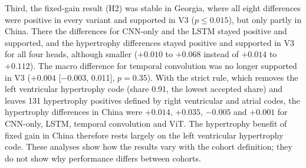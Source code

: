 \documentclass{wlscirep}
\begin{document}
Third, the fixed-gain result (H2) was stable in Georgia, where all eight differences were positive in every variant and supported in V3 ($p\le0.015$), but only partly in China. There the differences for CNN-only and the LSTM stayed positive and supported, and the hypertrophy differences stayed positive and supported in V3 for all four heads, although smaller ($+0.010$ to $+0.068$ instead of $+0.014$ to $+0.112$). The macro difference for temporal convolution was no longer supported in V3 ($+0.004$ [$-$0.003, 0.011], $p=0.35$). With the strict rule, which removes the left ventricular hypertrophy code (share 0.91, the lowest accepted share) and leaves 131 hypertrophy positives defined by right ventricular and atrial codes, the hypertrophy differences in China were $+0.014$, $+0.035$, $-0.005$ and $+0.001$ for CNN-only, LSTM, temporal convolution and ViT. The hypertrophy benefit of fixed gain in China therefore rests largely on the left ventricular hypertrophy code. These analyses show how the results vary with the cohort definition; they do not show why performance differs between cohorts.
\end{document}
